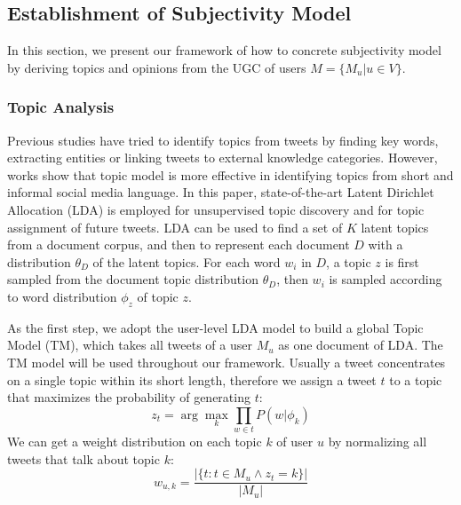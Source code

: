 \documentclass[letterpaper]{article}
\begin{document}
 
\subsection{Establishment of Subjectivity Model}
\label{establishment}

In this section, we present our framework of how to concrete subjectivity model by deriving topics and opinions from the UGC of users $ M=\lbrace M_{u}\vert u \in V\rbrace$.

\subsubsection{Topic Analysis}
\label{topic}

Previous studies have tried to identify topics from tweets by finding key words\cite{chen2010short}, extracting  entities\cite{abel2011analyzing} or linking tweets to external knowledge categories\cite{macskassy2011people}. However, works show that topic model is more effective in identifying topics from short and informal social media language\cite{hong2010empirical}. In this paper, state-of-the-art Latent Dirichlet Allocation (LDA)\cite{blei2003latent} is employed for unsupervised topic discovery and for topic assignment of future tweets. LDA can be used to find a set of $ K $ latent topics from a document corpus, and then to represent each document $ D $ with a distribution $ \theta_{D} $ of the latent topics. For each word $ w_{i} $ in $ D $, a topic $ z $ is first sampled from the document topic distribution $ \theta_{D} $, then $ w_{i} $ is sampled according to word distribution $ \phi_{z} $ of topic $ z $. 

As the first step, we adopt the user-level LDA model to build a global Topic Model (TM), which takes all tweets of a user $M_u$ as one document of LDA\cite{hong2010empirical}. The TM model will be used throughout our framework. 
Usually a tweet concentrates on a single topic within its short length, therefore we assign a tweet $ t $ to a topic that maximizes the probability of generating $ t $:
\begin{equation}
\label{twtopic}
z_{t} = \arg \max_{k}\prod_{w \in t} P(w|\phi_{k})
\end{equation}
We can get a weight distribution on each topic $ k $ of user $ u $ by normalizing all tweets that talk about topic $ k $: 
\begin{equation}
w_{u,k}=\dfrac{|\{ t: t \in M_{u} \wedge z_{t}=k\}|}{|M_{u}|}
\end{equation}
\end{document}
